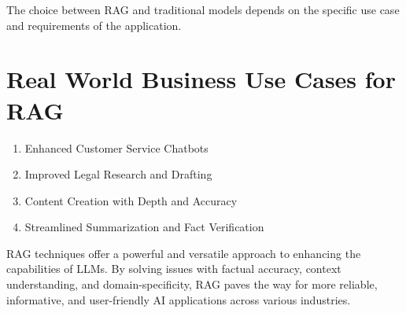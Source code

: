 \documentclass[../main.tex]{subfiles}
\begin{document}
The choice between RAG and traditional models depends on the specific use case and requirements of the application.

\section{Real World Business Use Cases for RAG}
\begin{enumerate}
	\item Enhanced Customer Service Chatbots
	\item Improved Legal Research and Drafting
	\item Content Creation with Depth and Accuracy
	\item Streamlined Summarization and Fact Verification
\end{enumerate}
RAG techniques offer a powerful and versatile approach to enhancing the capabilities of LLMs.
By solving issues with factual accuracy, context understanding, and domain-specificity, RAG paves the way for more reliable, informative, and user-friendly AI applications across various industries.


























\printglossaries
\end{document}
